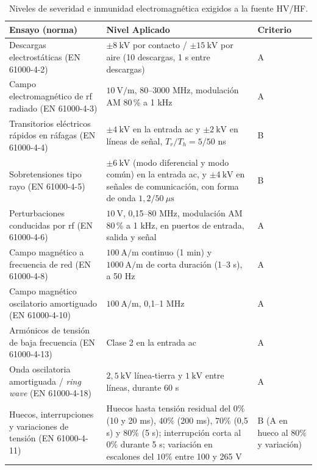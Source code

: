 \begin{table}[!h]
\centering
\small
\begin{tabular}{|p{4.6cm}|p{7.5cm}|p{2.2cm}|}
\hline
\textbf{Ensayo (norma)} & \textbf{Nivel Aplicado} & \textbf{Criterio} \\ \hline
Descargas electrostáticas (EN 61000-4-2) & $\pm 8\ \text{kV}$ por contacto / $\pm 15\ \text{kV}$ por aire (10 descargas, 1 s entre descargas) & A \\ \hline
Campo electromagnético de \gls{rf} radiado (EN 61000-4-3) & $10\ \text{V/m}$, 80--3000 MHz, modulación AM 80\,\% a 1 kHz & A \\ \hline
Transitorios eléctricos rápidos en ráfagas (EN 61000-4-4) & $\pm 4\ \text{kV}$ en la entrada \gls{ac} y $\pm 2\ \text{kV}$ en líneas de señal, $T_r/T_h = 5/50$ ns & B \\ \hline
Sobretensiones tipo rayo (EN 61000-4-5) & $\pm 6\ \text{kV}$ (modo diferencial y modo común) en la entrada \gls{ac}, y $\pm 4\ \text{kV}$ en señales de comunicación, con forma de onda $1,2/50\ \mu\text{s}$ & B \\ \hline
Perturbaciones conducidas por \gls{rf} (EN 61000-4-6) & $10\ \text{V}$, 0,15--80 MHz, modulación AM 80\,\% a 1 kHz, en puertos de entrada, salida y señal & A \\ \hline
Campo magnético a frecuencia de red (EN 61000-4-8) & $100\ \text{A/m}$ continuo (1 min) y $1000\ \text{A/m}$ de corta duración (1--3 s), a 50 Hz & A \\ \hline
Campo magnético oscilatorio amortiguado (EN 61000-4-10) & $100\ \text{A/m}$, 0,1--1 MHz & A \\ \hline
Armónicos de tensión de baja frecuencia (EN 61000-4-13) & Clase 2 en la entrada \gls{ac} & A \\ \hline
Onda oscilatoria amortiguada / \textit{ring wave} (EN 61000-4-18) & $2,5\ \text{kV}$ línea-tierra y $1\ \text{kV}$ entre líneas, durante 60 s & A \\ \hline
Huecos, interrupciones y variaciones de tensión (EN 61000-4-11) & Huecos hasta tensión residual del $0\%$ (10 y 20 ms), $40\%$ (200 ms), $70\%$ (0,5 s) y $80\%$ (5 s); interrupción corta al $0\%$ durante 5 s; variación en escalones del $10\%$ entre 100 y 265 V & B (A en hueco al $80\%$ y variación) \\ \hline
\end{tabular}
\caption{Niveles de severidad e inmunidad electromagnética exigidos a la fuente HV/HF.}
\label{tab:requisitos_emc_inmunidad}
\end{table}

